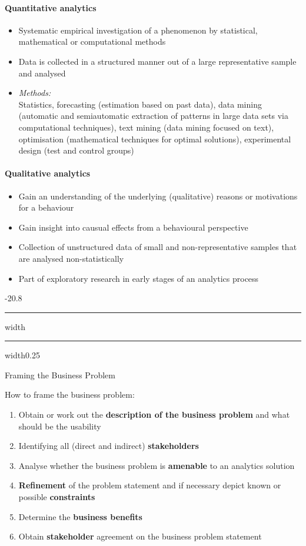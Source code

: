 \documentclass[a4paper, landscape, 6pt, fleqn]{scrartcl}
\makeatletter
\renewcommand{\emph}[1]{\textbf{#1}}
\renewcommand{\section}{\@startsection{section}{1}{0mm}%
{-2\baselineskip}{0.8\baselineskip}%
{\hrule depth 0.2pt width\columnwidth\hrule depth1.5pt
width0.25\columnwidth\vspace*{1.2em}\Large\bfseries}}
\makeatother
\begin{document}
\begin{multicols*}{4}
\paragraph{Quantitative analytics}

\begin{itemize}
\item Systematic empirical investigation of a phenomenon by statistical, mathematical or computational methods
\item Data is collected in a structured manner out of a large representative sample and analysed
\item \textit{Methods:} \\
Statistics, forecasting (estimation based on past data), data mining (automatic and semiautomatic extraction of patterns in large data sets via computational techniques), text mining (data mining focused on text), optimisation (mathematical techniques for optimal solutions), experimental design (test and control groups)
\end{itemize}

\paragraph{Qualitative analytics}

\begin{itemize}
\item Gain an understanding of the underlying (qualitative) reasons or motivations for a behaviour
\item Gain insight into causual effects from a behavioural perspective
\item Collection of unstructured data of small and non-representative samples that are analysed non-statistically
\item Part of exploratory research in early stages of an analytics process
\end{itemize}

\section{Framing the Business Problem}

How to frame the business problem:
\begin{enumerate}
\item Obtain or work out the \emph{description of the business problem} and what should be the usability
\item Identifying all (direct and indirect) \emph{stakeholders}
\item Analyse whether the business problem is \emph{amenable} to an analytics solution
\item \emph{Refinement} of the problem statement and if necessary depict known or possible \emph{constraints}
\item Determine the \emph{business benefits}
\item Obtain \emph{stakeholder} agreement on the business problem statement
\end{enumerate}


\end{multicols*}
\end{document}
